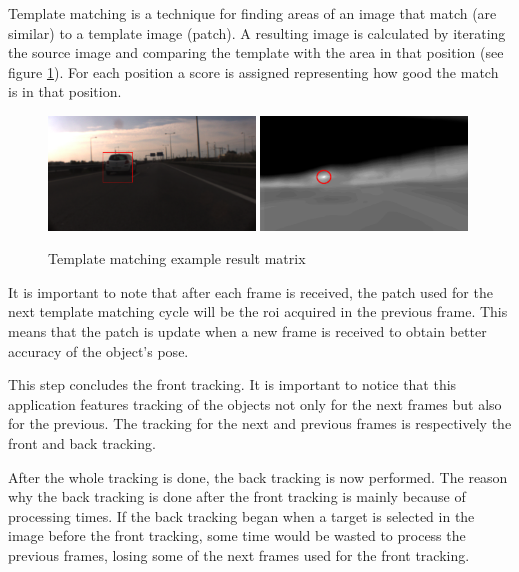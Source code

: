 Template matching is a technique for finding areas of an image that match (are similar) to a template image (patch). A resulting image is calculated by iterating the source image and comparing the template with the area in that position (see figure \ref{fig:resultmat}). For each position a score is assigned representing how good the match is in that position.

\begin{figure}[htp]
	
	\centering
	\includegraphics[width=0.49\textwidth]{caplabel/imgs/resultmat.png}\hfill
	\includegraphics[width=0.49\textwidth]{caplabel/imgs/resultmat2.png}
	
	\caption{Template matching example result matrix}
	\label{fig:resultmat}
	
\end{figure}

It is important to note that after each frame is received, the patch used for the next template matching cycle will be the \gls{roi} acquired in the previous frame. This means that the patch is update when a new frame is received to obtain better accuracy of the object's pose. 

This step concludes the front tracking. It is important to notice that this application features tracking of the objects not only for the next frames but also for the previous. The tracking for the next and previous frames is respectively the front and back tracking.

After the whole tracking is done, the back tracking is now performed. The reason why the back tracking is done after the front tracking is mainly because of processing times. If the back tracking began when a target is selected in the image before the front tracking, some time would be wasted to process the previous frames, losing some of the next frames used for the front tracking. 

